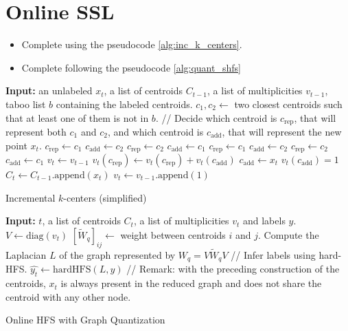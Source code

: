\documentclass{article}
\begin{document}
\section{Online SSL}

\begin{itemize}
	\item Complete  using the pseudocode \ref{alg:inc_k_centers}.
	\item Complete  following the
pseudocode \ref{alg:quant_shfs}
\end{itemize}



\begin{algorithm}[H]
	\begin{algorithmic}[1]
		{\small
			\STATE  \textbf{Input:} an unlabeled $x_t$, a list of centroids $C_{t - 1}$, a list of multiplicities $v_{t-1}$, taboo list $b$ containing the labeled centroids.
				\STATE $c_1, c_2 \gets $ two closest centroids such that at least one of them is not in $b$.
				\STATE // Decide which centroid is $c_{\mathrm{rep}}$, that will represent both $c_1$ and $c_2$, and which centroid is $c_{\mathrm{add}}$, that will represent the new point $x_t$.
					\STATE $c_{\mathrm{rep}} \gets c_1$
					\STATE $c_{\mathrm{add}} \gets c_2$
					\STATE $c_{\mathrm{rep}} \gets c_2$
					\STATE $c_{\mathrm{add}} \gets c_1$
					\STATE $c_{\mathrm{rep}} \gets c_1$
					\STATE $c_{\mathrm{add}} \gets c_2$ 
				\ELSE 
					\STATE $c_{\mathrm{rep}} \gets c_2$
					\STATE $c_{\mathrm{add}} \gets c_1$
				\ENDIF  
				\STATE $v_t \gets v_{t-1}$
				\STATE $v_t(c_{\mathrm{rep}}) \gets v_t(c_{\mathrm{rep}}) + v_t(c_{\mathrm{add}})$
				\STATE $c_{\mathrm{add}} \gets x_t$
				\STATE $v_t(c_{\mathrm{add}}) = 1$
			\ELSE
				\STATE  $C_t \gets C_{t - 1}.\mathrm{append}(x_t)$
				\STATE  $v_t \gets v_{t-1}.\mathrm{append}(1)$
			\ENDIF
		}
	\end{algorithmic}
	\caption{Incremental $k$-centers (simplified)}\label{alg:inc_k_centers}
\end{algorithm}

\begin{algorithm}[H]
	\begin{algorithmic}[1]
		\STATE  \textbf{Input:} $t$, a list of centroids $C_t$, a list of multiplicities $v_t$ and labels $y$.
		\STATE $V \gets \mathrm{diag}(v_t)$
		\STATE $[\widetilde{W}_q]_{ij} \gets$ weight between centroids $i$ and $j$. 
		\STATE Compute the Laplacian $L$ of the graph represented by $W_q = V\widetilde{W}_qV$
		\STATE  // Infer labels using hard-HFS.
		\STATE $\widehat{y_t} \gets \mathrm{hardHFS}(L, y)$
		\STATE // Remark: with the preceding construction of the centroids, $x_t$ is always present in the reduced graph and does not share the centroid with any other node.
	\end{algorithmic}
	\caption{Online HFS with Graph Quantization}\label{alg:quant_shfs}
\end{algorithm}
\end{document}
